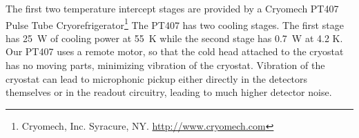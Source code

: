 The first two temperature intercept stages are provided by a Cryomech PT407 Pulse Tube Cryorefrigerator\footnote{Cryomech, Inc. Syracure, NY. \url{http://www.cryomech.com}}
The PT407 has two cooling stages.
The first stage has 25~W of cooling power at 55~K while the second stage has 0.7~W at 4.2 K.
Our PT407 uses a remote motor, so that the cold head attached to the cryostat has no moving parts, minimizing vibration of the cryostat.
Vibration of the cryostat can lead to microphonic pickup either directly in the detectors themselves or in the readout circuitry, leading to much higher detector noise.

\begin{figure}[t]
\centering
{}
\end{figure}
